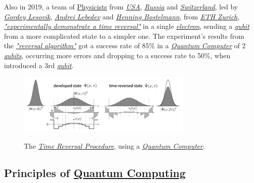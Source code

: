 \documentclass[conference]{IEEEtran}
\begin{document}
\vspace{4pt}

Also in 2019, a team of \href{https://en.wikipedia.org/wiki/Physicist}{Physicists} from \href{https://en.wikipedia.org/wiki/United_States}{\textit{USA}}, \href{https://en.wikipedia.org/wiki/Russia}{\textit{Russia}} and \href{https://en.wikipedia.org/wiki/Switzerland}{\textit{Switzerland}}, led by \href{https://www.researchgate.net/profile/Gordey_Lesovik}{\textit{Gordey Lesovik}}, \href{https://www.researchgate.net/profile/Andrey_Lebedev4}{\textit{Andrei Lebedev}} and \href{https://www.researchgate.net/profile/Henning_Bostelmann}{\textit{Henning Bostelmann}}, from \href{https://www.ethz.ch/en.html}{\textit{ETH Zurich}},  \href{https://en.wikipedia.org/wiki/Electron}{\textit{"experimentally demonstrate a time reversal"}} in a single \href{https://en.wikipedia.org/wiki/Electron}{\textit{electron}}, sending a \href{https://en.wikipedia.org/wiki/Qubit}{\textit{qubit}} from a more complicated state to a simpler one. The experiment's results from the \href{https://www.researchgate.net/publication/322160389_Arrow_of_time_and_its_reversal_on_IBM_quantum_computer}{\textit{"reversal algorithm"}} got a success rate of 85\% in a \href{https://en.wikipedia.org/wiki/Quantum_computing}{\textit{Quantum Computer}} of 2 \href{https://en.wikipedia.org/wiki/Qubit}{\textit{qubits}}, occurring more errors and dropping to a success rate to 50\%, when introduced a 3rd \href{https://en.wikipedia.org/wiki/Qubit}{\textit{qubit}}.\cite{b6}

\begin{center}
  \begin{figure}[htbp]
    \centerline{\href{https://www.nature.com/articles/s41598-019-40765-6}{\includegraphics{imgs/fig-1.png}}}
    \caption{The \href{https://www.nature.com/articles/s41598-019-40765-6}{\textit{Time Reversal Procedure}}, using a \href{https://en.wikipedia.org/wiki/Quantum_computing}{\textit{Quantum Computer}}.}
    \label{fig}
  \end{figure}
\end{center}

\newpage

\subsection{Principles of \href{https://en.wikipedia.org/wiki/Quantum_computing}{Quantum Computing}}\label{AA}
\end{document}
